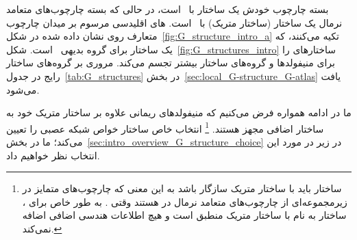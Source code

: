 بسته چارچوب \lr{$\FM$} خودش یک ساختار  با~ است، در حالی که بسته چارچوب‌های متعامد نرمال \lr{$\OM$} یک ساختار  (ساختار متریک) با~ است.
های اقلیدسی مرسوم بر میدان چارچوب متعارف روی  نشان داده شده در شکل~\ref{fig:G_structure_intro_a} تکیه می‌کنند، که یک ساختار  برای گروه بدیهی~ است.
شکل~\ref{fig:G_structures_intro} ساختارهای  را برای منیفولدها و گروه‌های ساختار بیشتر تجسم می‌کند.
مروری بر گروه‌های ساختار رایج در جدول~\ref{tab:G_structures} در بخش~\ref{sec:local_G-structure_G-atlas} یافت می‌شود.


ما در ادامه همواره فرض می‌کنیم که منیفولدهای ریمانی علاوه بر ساختار متریک خود به ساختار  اضافی مجهز هستند.%
\footnote{
	ساختار  باید با ساختار متریک سازگار باشد به این معنی که چارچوب‌های متمایز در \lr{$\GM$} زیرمجموعه‌ای از چارچوب‌های متعامد نرمال در \lr{$\OM$} هستند وقتی .
	به طور خاص برای ، ساختار  به نام \lr{$\GM$} با ساختار متریک \lr{$\OM$} منطبق است و هیچ اطلاعات هندسی اضافی اضافه نمی‌کند.
}
انتخاب خاص ساختار  خواص شبکه عصبی را تعیین می‌کند؛ ما در بخش~\ref{sec:intro_overview_G_structure_choice} در زیر در مورد این انتخاب نظر خواهیم داد.





